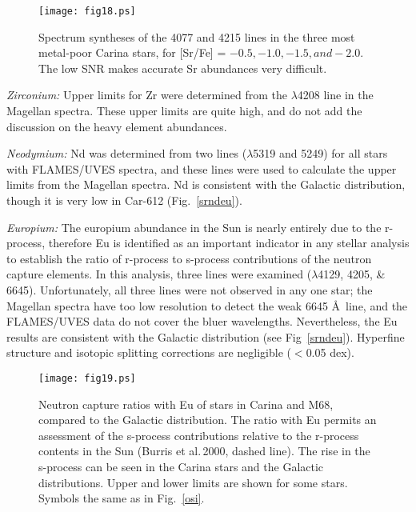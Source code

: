 \documentclass{emulateapj}
\newcommand\etal{{\rm et al.\,}}
\begin{document}
\begin{figure}[h]
\texttt{[image: fig18.ps]}
\caption{
Spectrum syntheses of the  4077 and 4215 lines in the 
three most metal-poor Carina stars, 
for [Sr/Fe] = $-0.5, -1.0, -1.5, and -2.0$.
The low SNR makes accurate Sr abundances very difficult.    
}
\label{srsyn}
\end{figure}



{\it Zirconium:}
Upper limits for Zr were determined from the  $\lambda$4208
line in the Magellan spectra.
These upper limits are quite high, and do not add the discussion on
the heavy element abundances.



{\it Neodymium:}
Nd was determined from two  lines ($\lambda$5319 and 5249) for 
all stars with FLAMES/UVES spectra, and these lines were used to calculate
the upper limits from the Magellan spectra.  
Nd is consistent with the Galactic distribution, though it is very
low in Car-612 (Fig.~\ref{srndeu}).


{\it Europium:}
The europium abundance in the Sun is nearly entirely due to the
r-process, therefore Eu is identified as an important indicator 
in any stellar analysis to establish the ratio of r-process to 
s-process contributions of the neutron capture elements.
%
In this analysis, three  lines were examined
($\lambda$4129, 4205, \& 6645).      Unfortunately, all three 
lines were not observed in any one star;  the Magellan spectra 
have too low resolution to detect the weak 6645 \AA\ line, and
the FLAMES/UVES data do not cover the bluer wavelengths.     
Nevertheless, the Eu results are consistent 
with the Galactic distribution (see Fig~\ref{srndeu}).
Hyperfine structure and isotopic splitting
corrections are negligible ($<$0.05 dex). 



\begin{figure}[t]
\texttt{[image: fig19.ps]}
\caption{Neutron capture ratios with Eu of stars in Carina and M68,
compared to the Galactic distribution.  The ratio with Eu permits
an assessment of the s-process contributions relative to the r-process
contents in the Sun (Burris \etal  2000, dashed line).   
The rise in the s-process can be seen in the Carina stars and the 
Galactic distributions.   
% 
Upper and lower limits are shown for some stars. 
Symbols the same as in Fig.~\ref{osi}. \\
}
\label{xeu}
\end{figure}
\end{document}
